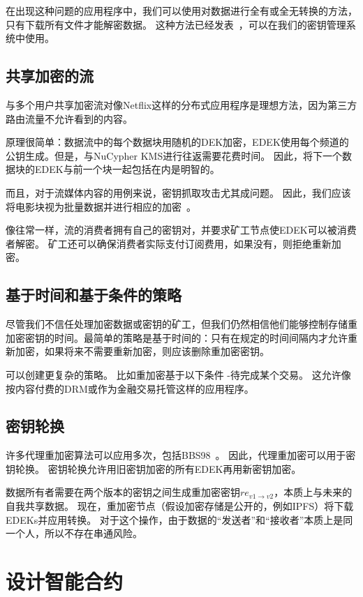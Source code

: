 \documentclass[longbibliography,nofootinbib]{revtex4-1}
\newcommand{\kms}{NuCypher KMS}
\begin{document}
    在出现这种问题的应用程序中，我们可以使用对数据进行全有或全无转换的方法，只有下载所有文件才能解密数据。 这种方法已经发表~\cite{aont-bulk}，可以在我们的密钥管理系统中使用。

\subsection{共享加密的流}

与多个用户共享加密流对像Netflix这样的分布式应用程序是理想方法，因为第三方路由流量不允许看到的内容。

    原理很简单：数据流中的每个数据块用随机的DEK加密，EDEK使用每个频道的公钥生成。但是，与\kms 进行往返需要花费时间。 因此，将下一个数据块的EDEK与前一个块一起包括在内是明智的。
    
    而且，对于流媒体内容的用例来说，密钥抓取攻击尤其成问题。 因此，我们应该将电影块视为批量数据并进行相应的加密~\cite{aont-bulk}。
    
    像往常一样，流的消费者拥有自己的密钥对，并要求矿工节点使EDEK可以被消费者解密。 矿工还可以确保消费者实际支付订阅费用，如果没有，则拒绝重新加密。


\subsection{基于时间和基于条件的策略}

    尽管我们不信任处理加密数据或密钥的矿工，但我们仍然相信他们能够控制存储重加密密钥的时间。最简单的策略是基于时间的：只有在规定的时间间隔内才允许重新加密，如果将来不需要重新加密，则应该删除重加密密钥。
    
    可以创建更复杂的策略。 比如重加密基于以下条件 -待完成某个交易。 这允许像按内容付费的DRM或作为金融交易托管这样的应用程序。


\subsection{密钥轮换}
\label{sec:key-rotation}

    许多代理重加密算法可以应用多次，包括BBS98~\cite{BBS98}。 因此，代理重加密可以用于密钥轮换。 密钥轮换允许用旧密钥加密的所有EDEK再用新密钥加密。
    
    数据所有者需要在两个版本的密钥之间生成重加密密钥$re_{v1\rightarrow v2}$，本质上与未来的自我共享数据。 现在，重加密节点（假设加密存储是公开的，例如IPFS）将下载EDEKs并应用转换。 对于这个操作，由于数据的“发送者”和“接收者”本质上是同一个人，所以不存在串通风险。

\section{设计智能合约}
\label{sec:smart-contract}
\end{document}
